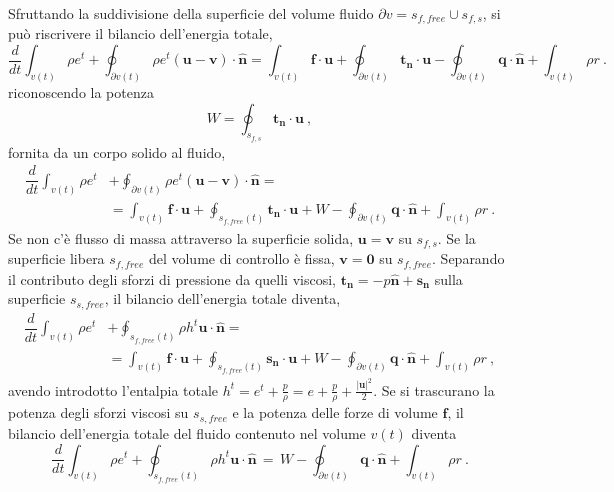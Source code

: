 Sfruttando la suddivisione della superficie del volume fluido $\partial v = s_{f,free} \cup s_{f,s}$, si può riscrivere il bilancio dell'energia totale,
\begin{equation}
 \dfrac{d}{dt} \displaystyle\int_{v(t)} \rho e^t + \oint_{\partial v(t)} \rho e^t (\bm{u}-\bm{v}) \cdot \bm{\hat{n}}= \int_{v(t)} \bm{f} \cdot \bm{u} + \oint_{\partial v(t)} \bm{t_n} \cdot \bm{u} - \oint_{\partial v(t)} \bm{q} \cdot \bm{\hat{n}} + \int_{v(t)} \rho r \ .
\end{equation}
riconoscendo la potenza
\begin{equation}
 W = \oint_{s_{f,s}} \bm{t_n} \cdot \bm{u} \ ,
\end{equation}
 fornita da un corpo solido al fluido,
\begin{equation}
\begin{aligned}
 \dfrac{d}{dt} \displaystyle\int_{v(t)} \rho e^t & + \oint_{\partial v(t)} \rho e^t (\bm{u}-\bm{v}) \cdot \bm{\hat{n}} = \\
  & = \int_{v(t)} \bm{f} \cdot \bm{u} + \oint_{s_{f,free}(t)} \bm{t_n} \cdot \bm{u} + W - \oint_{\partial v(t)} \bm{q} \cdot \bm{\hat{n}} + \int_{v(t)} \rho r \ .
\end{aligned}
\end{equation}
Se non c'è flusso di massa attraverso la superficie solida, $\bm{u} = \bm{v}$ su $s_{f,s}$. Se la superficie libera $s_{f,free}$ del volume di controllo è fissa, $\bm{v}= \bm{0}$ su $s_{f,free}$. Separando il contributo degli sforzi di pressione da quelli viscosi, $\bm{t_n} = -p\bm{\hat{n}} + \bm{s_n}$ sulla superficie $s_{s,free}$, il bilancio dell'energia totale diventa,
\begin{equation}
\begin{aligned}
 \dfrac{d}{dt} \displaystyle\int_{v(t)} \rho e^t & + \oint_{s_{f,free}(t)} \rho h^t \bm{u} \cdot \bm{\hat{n}} = \\
  & = \int_{v(t)} \bm{f} \cdot \bm{u} + \oint_{s_{f,free}(t)} \bm{s_n} \cdot \bm{u} + W - \oint_{\partial v(t)} \bm{q} \cdot \bm{\hat{n}} + \int_{v(t)} \rho r \ ,
\end{aligned}
\end{equation}
avendo introdotto l'entalpia totale $h^t = e^t + \frac{p}{\rho} = e + \frac{p}{\rho} + \frac{|\bm{u}|^2}{2}$.
%
Se si trascurano la potenza degli sforzi viscosi su $s_{s,free}$ e la potenza delle forze di volume $\bm{f}$, il bilancio dell'energia totale del fluido contenuto nel volume $v(t)$ diventa
\begin{equation}
 \dfrac{d}{dt} \displaystyle\int_{v(t)} \rho e^t + \oint_{s_{f,free}(t)} \rho h^t \bm{u} \cdot \bm{\hat{n}}
 \, = \,
  W - \oint_{\partial v(t)} \bm{q} \cdot \bm{\hat{n}} + \int_{v(t)} \rho r \ .
\end{equation}

